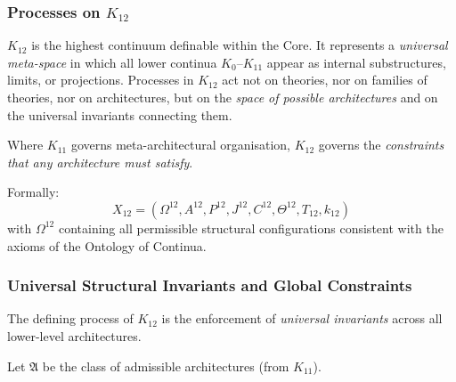 

\subsubsection{Processes on $K_{12}$}
\label{sec:processes-k12}

$K_{12}$ is the highest continuum definable within the Core.  
It represents a \emph{universal meta-space} in which all lower continua
$K_0$--$K_{11}$ appear as internal substructures, limits, or projections.
Processes in $K_{12}$ act not on theories, nor on families of theories,
nor on architectures, but on the \emph{space of possible architectures}
and on the universal invariants connecting them.

Where $K_{11}$ governs meta-architectural organisation,  
$K_{12}$ governs the \emph{constraints that any architecture must satisfy}.

Formally:
\[
X_{12} = (\Omega^{12}, A^{12}, P^{12}, J^{12}, 
          C^{12}, \Theta^{12}, T_{12}, k_{12})
\]
with $\Omega^{12}$ containing all permissible structural configurations
consistent with the axioms of the Ontology of Continua.

\subsubsection{Universal Structural Invariants and Global Constraints}

The defining process of $K_{12}$ is the enforcement of
\emph{universal invariants} across all lower-level architectures.

Let $\mathfrak{A}$ be the class of admissible architectures 
(from $K_{11}$).

